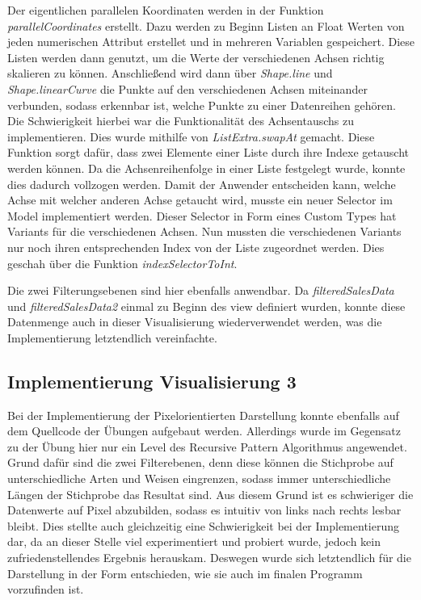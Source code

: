 \documentclass[usegeometry=true]{scrartcl}
\begin{document}
\noindent Der eigentlichen parallelen Koordinaten werden in der Funktion \textit{parallelCoordinates} erstellt. Dazu werden zu Beginn Listen an Float Werten von jeden
numerischen Attribut erstellet und in mehreren Variablen gespeichert. Diese Listen werden dann genutzt, um die Werte der verschiedenen Achsen richtig skalieren zu können.
Anschließend wird dann über \textit{Shape.line} und \textit{Shape.linearCurve} die Punkte auf den verschiedenen Achsen miteinander verbunden, sodass erkennbar ist, welche Punkte
zu einer Datenreihen gehören. \\

\noindent Die Schwierigkeit hierbei war die Funktionalität des Achsentauschs zu implementieren. Dies wurde mithilfe von \textit{ListExtra.swapAt} gemacht. Diese Funktion sorgt dafür,
dass zwei Elemente einer Liste durch ihre Indexe getauscht werden können. Da die Achsenreihenfolge in einer Liste festgelegt wurde, konnte dies dadurch vollzogen werden. Damit
der Anwender entscheiden kann, welche Achse mit welcher anderen Achse getaucht wird, musste ein neuer Selector im Model implementiert werden. Dieser Selector in Form
eines Custom Types hat Variants für die verschiedenen Achsen. Nun mussten die verschiedenen Variants nur noch ihren entsprechenden Index von der Liste zugeordnet werden.
Dies geschah über die Funktion \textit{indexSelectorToInt}.

\noindent Die zwei Filterungsebenen sind hier ebenfalls anwendbar. Da \textit{filteredSalesData} und \textit{filteredSalesData2} einmal zu Beginn des view definiert wurden,
konnte diese Datenmenge auch in dieser Visualisierung wiederverwendet werden, was die Implementierung letztendlich vereinfachte.

\subsection{Implementierung Visualisierung 3}
Bei der Implementierung der Pixelorientierten Darstellung konnte ebenfalls auf dem Quellcode der Übungen aufgebaut werden. Allerdings wurde im Gegensatz zu der Übung hier nur
ein Level des Recursive Pattern Algorithmus angewendet. Grund dafür sind die zwei Filterebenen, denn diese können die Stichprobe auf unterschiedliche Arten und Weisen eingrenzen,
sodass immer unterschiedliche Längen der Stichprobe das Resultat sind. Aus diesem Grund ist es schwieriger die Datenwerte auf Pixel abzubilden, sodass es intuitiv von links nach
rechts lesbar bleibt. Dies stellte auch gleichzeitig eine Schwierigkeit bei der Implementierung dar, da an dieser Stelle viel experimentiert und probiert wurde, jedoch kein
zufriedenstellendes Ergebnis herauskam. Deswegen wurde sich letztendlich für die Darstellung in der Form entschieden, wie sie auch im finalen Programm vorzufinden ist.\\
\end{document}
